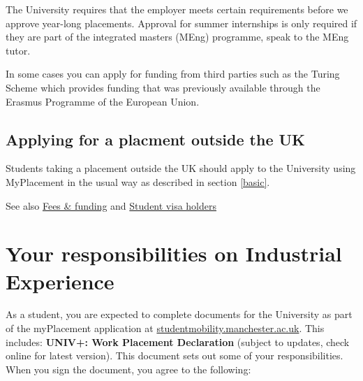 \documentclass[
]{book}
\begin{document}
The University requires that the employer meets certain requirements before we approve year-long placements. Approval for summer internships is only required if they are part of the integrated masters (MEng) programme, speak to the MEng tutor.

In some cases you can apply for funding from third parties such as the Turing Scheme which provides funding that was previously available through the Erasmus Programme of the European Union. \citep{turing}

\section{Applying for a placment outside the UK}\label{applying-for-a-placment-outside-the-uk}

Students taking a placement outside the UK should apply to the University using MyPlacement in the usual way as described in section \ref{basic}.

See also \href{https://www.manchester.ac.uk/study/undergraduate/fees-and-funding/}{Fees \& funding} and \href{https://www.studentsupport.manchester.ac.uk/immigration-and-visas/}{Student visa holders}

\chapter{Your responsibilities on Industrial Experience}\label{you}

As a student, you are expected to complete documents for the University as part of the myPlacement application at \href{https://studentmobility.manchester.ac.uk/}{studentmobility.manchester.ac.uk}. This includes: \textbf{UNIV+: Work Placement Declaration }(subject to updates, check online for latest version). This document sets out some of your responsibilities. When you sign the document, you agree to the following:
\end{document}
